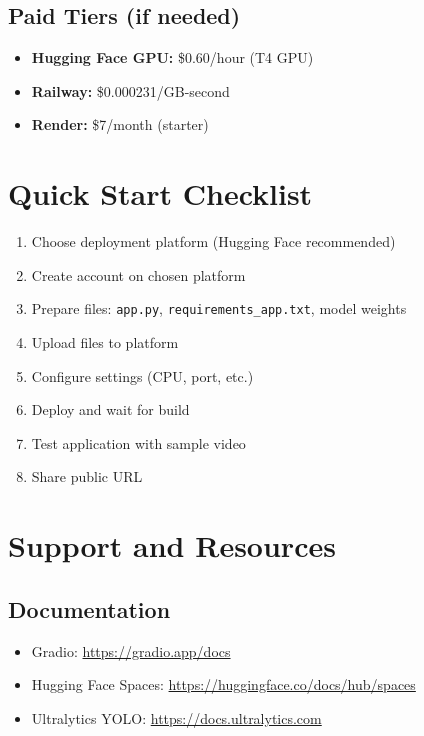 \documentclass[11pt,a4paper]{article}
\begin{document}
\subsection{Paid Tiers (if needed)}
\begin{itemize}
    \item \textbf{Hugging Face GPU:} \$0.60/hour (T4 GPU)
    \item \textbf{Railway:} \$0.000231/GB-second
    \item \textbf{Render:} \$7/month (starter)
\end{itemize}

\section{Quick Start Checklist}

\begin{enumerate}
    \item[$\square$] Choose deployment platform (Hugging Face recommended)
    \item[$\square$] Create account on chosen platform
    \item[$\square$] Prepare files: \texttt{app.py}, \texttt{requirements\_app.txt}, model weights
    \item[$\square$] Upload files to platform
    \item[$\square$] Configure settings (CPU, port, etc.)
    \item[$\square$] Deploy and wait for build
    \item[$\square$] Test application with sample video
    \item[$\square$] Share public URL
\end{enumerate}

\section{Support and Resources}

\subsection{Documentation}
\begin{itemize}
    \item Gradio: \url{https://gradio.app/docs}
    \item Hugging Face Spaces: \url{https://huggingface.co/docs/hub/spaces}
    \item Ultralytics YOLO: \url{https://docs.ultralytics.com}
\end{itemize}
\end{document}
